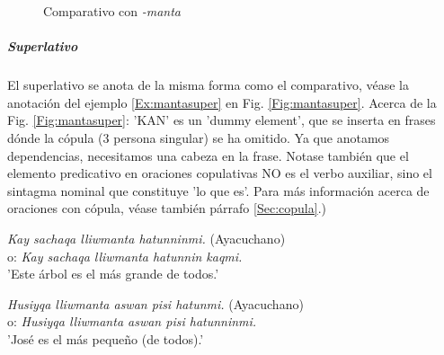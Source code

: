 \documentclass[a4paper,11pt,DIV12]{scrartcl}
\begin{document}
\begin{figure}
\begin{center}
\caption{Comparativo con {\em -manta}}\label{Fig:mantacomp}
\end{center}
\end{figure}

\subparagraph{Superlativo}

El superlativo se anota de la misma forma como el comparativo, v\'ease la anotaci\'on del ejemplo \ref{Ex:mantasuper} en Fig. \ref{Fig:mantasuper}. Acerca de la Fig. \ref{Fig:mantasuper}: 'KAN' es un 'dummy element', que se inserta en frases d\'onde la c\'opula (3{\textordfeminine} persona singular) se ha omitido. Ya que anotamos dependencias, necesitamos una cabeza en la frase. Notase tambi\'en que el elemento predicativo en oraciones copulativas NO es el verbo auxiliar, sino el sintagma nominal que constituye 'lo que es'. Para m\'as informaci\'on acerca de oraciones con c\'opula, v\'ease tambi\'en p\'arrafo \ref{Sec:copula}.) 

\begin{examples}
 \item {\em Kay sachaqa lliwmanta hatunninmi.} (Ayacuchano)\\
      o: {\em Kay sachaqa lliwmanta hatunnin kaqmi.}\\
      'Este \'arbol es el m\'as grande de todos.'
 \item\label{Ex:mantasuper} {\em Husiyqa lliwmanta aswan pisi hatunmi.} (Ayacuchano)\\
      o: {\em Husiyqa lliwmanta aswan pisi hatunninmi.} \\
      'Jos\'e es el m\'as peque\~no (de todos).'\\
	\hfill{\small \citep[189-190]{Dedenbach02}}
\end{examples}
\end{document}
